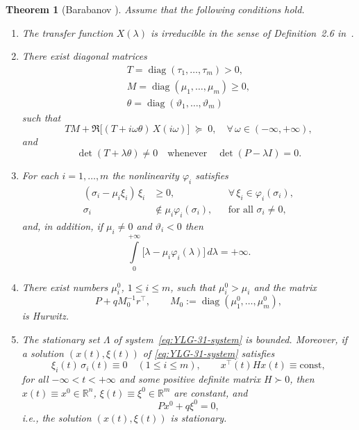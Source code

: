 \documentclass[journal]{IEEEtran}
\newtheorem{theorem}{Theorem}
\begin{document}
\begin{theorem}[Barabanov {\cite[Thm.~3.1]{YLG}}]\label{th:YLG-3-1}
Assume that the following conditions hold.
\begin{enumerate}%
\item The transfer function $X(\lambda)$ is \emph{irreducible} in the
sense of Definition~2.6 in~\cite{YLG}.

\item There exist diagonal matrices
\begin{multline*}
   T=\operatorname{diag}(\tau_1,\dots,\tau_m)>0,\\
   M=\operatorname{diag}(\mu_1,\dots,\mu_m)\ge0,\\
   \theta=\operatorname{diag}(\vartheta_1,\dots,\vartheta_m)      
\end{multline*}
such that
\begin{equation}
   T M + \Re\bigl[(T+i\omega\theta)\,X(i\omega)\bigr] \;\succeq\; 0,
   \quad \forall\,\omega\in(-\infty,+\infty),
   \label{eq:YLG-31-freq}
\end{equation}
and
\begin{equation}
   \det(T+\lambda\theta)\neq0
   \quad\text{whenever}\quad
   \det(P-\lambda I)=0 .
   \label{eq:YLG-31-det}
\end{equation}

\item For each $i=1,\dots,m$ the nonlinearity $\varphi_i$ satisfies
\begin{align}
 (\sigma_i-\mu_i\xi_i)\,\xi_i &\ge 0,
   &&\forall\,\xi_i\in\varphi_i(\sigma_i),
   \label{eq:YLG-31-sector}\\
 \sigma_i &\notin \mu_i\varphi_i(\sigma_i),
   &&\text{for all }\sigma_i\neq0 ,
   \label{eq:YLG-31-sigma-notin}
\end{align}
and, in addition, if $\mu_i\neq0$ and $\vartheta_i<0$ then
\begin{equation}
   \int\limits_0^{+\infty} \bigl[\lambda-\mu_i\varphi_i(\lambda)\bigr]\,d\lambda
   = +\infty .
   \label{eq:YLG-31-integral}
\end{equation}

\item There exist numbers $\mu_i^0$, $1\le i\le m$, such that
$\mu_i^0>\mu_i$ and the matrix
\[
   P + q M_0^{-1} r^{\top}, 
   \qquad M_0 := \operatorname{diag}(\mu_1^0,\dots,\mu_m^0),
\]
is Hurwitz.

\item The stationary set $\Lambda$ of system~\eqref{eq:YLG-31-system}
is bounded. Moreover, if a solution $(x(t),\xi(t))$ of
\eqref{eq:YLG-31-system} satisfies
\begin{equation}
   \xi_i(t)\,\sigma_i(t)\equiv 0\quad(1\le i\le m), 
   \qquad x^{\top}(t)H x(t)\equiv\mathrm{const},
   \label{eq:YLG-31-orthogonality}
\end{equation}
for all $-\infty<t<+\infty$ and some positive definite matrix
$H\succ0$, then $x(t)\equiv x^0\in\mathbb{R}^n$, 
$\xi(t)\equiv\xi^0\in\mathbb{R}^m$ are constant, and
\[
   P x^0 + q\xi^0 = 0,
\]
i.e., the solution $(x(t),\xi(t))$ is stationary.


\end{enumerate}
\end{theorem}
\end{document}
